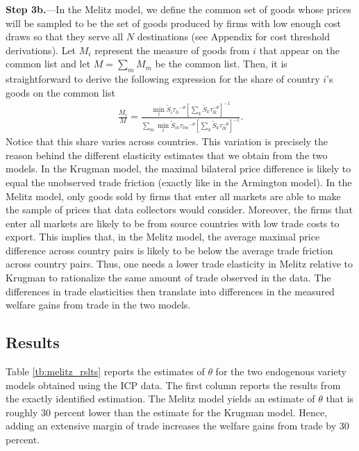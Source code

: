 \documentclass[12pt,dvips, ps2pdf]{article}
\begin{document}
\textbf{Step 3b.}---In the Melitz model, we define the common set of goods whose prices will be sampled to be the set of goods produced by firms with low enough cost draws so that they serve all $N$ destinations (see Appendix for cost threshold derivations). Let $M_i$ represent the measure of goods from $i$ that appear on the common list and let $M=\sum_m M_m$ be the common list. Then, it is straightforward to derive the following expression for the share of country $i$'s goods on the common list
\begin{align}
\label{mel_common}
\frac{M_{i}}{M}=\frac{\min_{l}\tilde S_i{\tau_{li}}^{-\theta}\left[\sum_k\tilde S_k\tau_{lk}^{-\theta}\right]^{-1}}{\sum_m\min_{l}\tilde S_m{\tau_{lm}}^{-\theta}\left[\sum_k\tilde S_k \tau_{lk}^{-\theta}\right]^{-1}}.
\end{align}
Notice that this share varies across countries. This variation is precisely the reason behind the different elasticity estimates that we obtain from the two models. In the Krugman model, the maximal bilateral price difference is likely to equal the unobserved trade friction (exactly like in the Armington model). In the Melitz model, only goods sold by firms that enter all markets are able to make the sample of prices that data collectors would consider. Moreover, the firms that enter all markets are likely to be from source countries with low trade costs to export. This implies that, in the Melitz model, the average maximal price difference across country pairs is likely to be below the average trade friction across country pairs. Thus, one needs a lower trade elasticity in Melitz relative to Krugman to rationalize the same amount of trade observed in the data. The differences in trade elasticities then translate into differences in the measured welfare gains from trade in the two models.

\subsection{Results}\label{sec:melitz_rslts}

Table \ref{tb:melitz_rslts} reports the estimates of $\theta$ for the two endogenous variety models obtained using the ICP data. The first column reports the results from the exactly identified estimation. The Melitz model yields an estimate of $\theta$ that is roughly 30 percent lower than the estimate for the Krugman model. Hence, adding an extensive margin of trade increases the welfare gains from trade by 30 percent.
\end{document}
